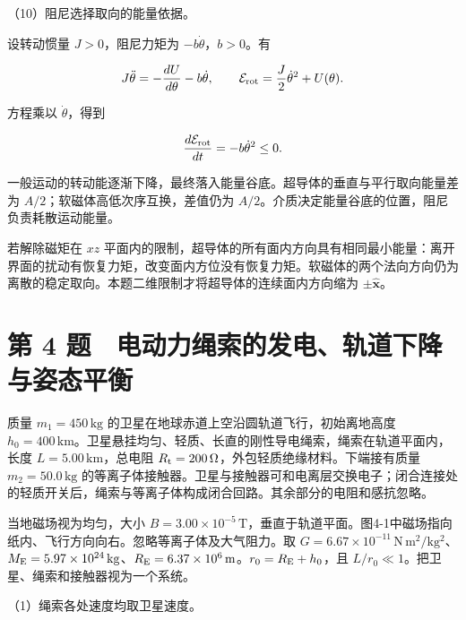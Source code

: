 \documentclass[12pt,a4paper,fontset=fandol]{ctexart}
\begin{document}
\par\noindent\begin{minipage}{\linewidth}
\setlength{\parindent}{2em}\setlength{\parskip}{.35em}
（10）阻尼选择取向的能量依据。

设转动惯量 \(J>0\)，阻尼力矩为 \(-b\dot\theta\)，\(b>0\)。有

\[
J\ddot\theta=-\frac{dU}{d\theta}-b\dot\theta,\qquad
\mathcal E_{\rm rot}=\frac J2\dot\theta^2+U(\theta).
\]

方程乘以 \(\dot\theta\)，得到

\[
\frac{d\mathcal E_{\rm rot}}{dt}=-b\dot\theta^2\le0.
\]

一般运动的转动能逐渐下降，最终落入能量谷底。超导体的垂直与平行取向能量差为
\(A/2\)；软磁体高低次序互换，差值仍为
\(A/2\)。介质决定能量谷底的位置，阻尼负责耗散运动能量。

若解除磁矩在 \(xz\)
平面内的限制，超导体的所有面内方向具有相同最小能量：离开界面的扰动有恢复力矩，改变面内方位没有恢复力矩。软磁体的两个法向方向仍为离散的稳定取向。本题二维限制才将超导体的连续面内方向缩为
\(\pm\hat{\boldsymbol x}\)。


\end{minipage}\par
\clearpage

\section{第 4
题　电动力绳索的发电、轨道下降与姿态平衡}\label{ux7b2c-4-ux9898-ux7535ux52a8ux529bux7ef3ux7d22ux7684ux53d1ux7535ux8f68ux9053ux4e0bux964dux4e0eux59ffux6001ux5e73ux8861}

质量 \(m_1=450\,\mathrm{kg}\)
的卫星在地球赤道上空沿圆轨道飞行，初始离地高度
\(h_0=400\,\mathrm{km}\)。卫星悬挂均匀、轻质、长直的刚性导电绳索，绳索在轨道平面内，长度
\(L=5.00\,\mathrm{km}\)，总电阻
\(R_{\rm t}=200\,\Omega\)，外包轻质绝缘材料。下端接有质量
\(m_2=50.0\,\mathrm{kg}\)
的等离子体接触器。卫星与接触器可和电离层交换电子；闭合连接处的轻质开关后，绳索与等离子体构成闭合回路。其余部分的电阻和感抗忽略。

当地磁场视为均匀，大小
\(B=3.00\times10^{-5}\,\mathrm T\)，垂直于轨道平面。图4-1中磁场指向纸内、飞行方向向右。忽略等离子体及大气阻力。取
\(G=6.67\times10^{-11}\,\mathrm{N\,m^2/kg^2}\)、\(M_{\rm E}=5.97\times10^{24}\,\mathrm{kg}\)、\(R_{\rm E}=6.37\times10^6\,\mathrm m\)。\(r_0=R_{\rm E}+h_0\)，且
\(L/r_0\ll1\)。把卫星、绳索和接触器视为一个系统。

（1）绳索各处速度均取卫星速度。
\end{document}
